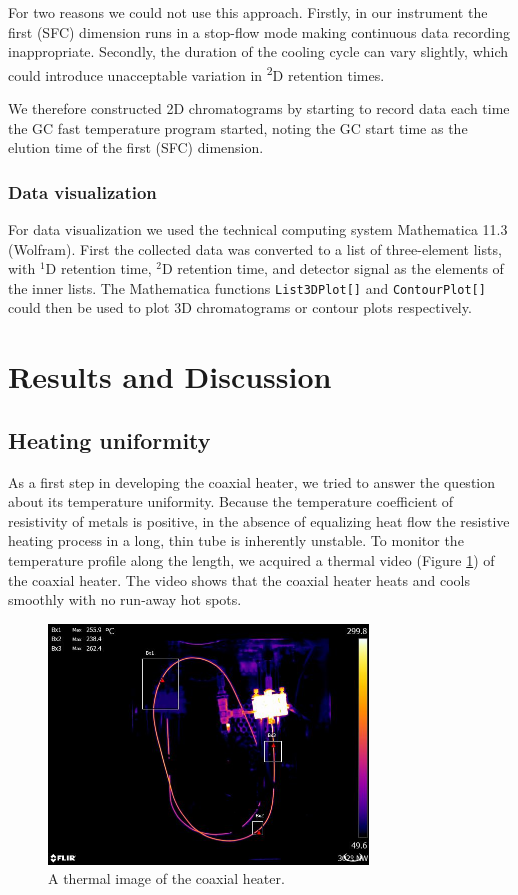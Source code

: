\documentclass[aip,rsi,preprint,graphicx]{revtex4-1} %
\begin{document}
For two reasons we could not use this approach. Firstly, in our instrument the
first (SFC) dimension runs in a stop-flow mode making continuous data recording
inappropriate. Secondly, the duration of the cooling cycle can vary slightly,
which could introduce unacceptable variation in \textsuperscript{2}D retention
times.

We therefore constructed 2D chromatograms by starting to record data each time
the GC fast temperature program started, noting the GC start time as the elution
time of the first (SFC) dimension.

\subsubsection{Data visualization}
For data visualization we used the technical computing system Mathematica
11.3\texttrademark{} (Wolfram).  First the collected data was converted to a
list of three-element lists, with $^1$D retention time, $^2$D retention time,
and detector signal as the elements of the inner lists. The Mathematica
functions \texttt{List3DPlot[]} and \texttt{ContourPlot[]} could then be used to
plot 3D chromatograms or contour plots respectively.

\section{Results and Discussion}

\subsection{Heating uniformity}

As a first step in developing the coaxial heater, we tried to answer the
question about its temperature uniformity. Because the temperature coefficient
of resistivity of metals is positive, in the absence of equalizing heat flow the
resistive heating process in a long, thin tube is inherently unstable. To
monitor the temperature profile along the length, we acquired a thermal video
(Figure \ref{fig:ThermImg}) of the coaxial heater. The video shows that the
coaxial heater heats and cools smoothly with no run-away hot spots.


\begin{figure}
\includegraphics[width=8.5cm]{./Figures/1-16.jpg}%
\caption{\label{fig:ThermImg}A thermal image of the coaxial heater.}%
\end{figure}
\end{document}
